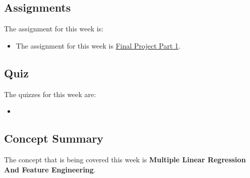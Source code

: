 \subsection{Assignments}

The assignment for this week is:

\begin{itemize}
    \item The assignment for this week is \href{https://github.com/QuantumCompiler/CU/tree/main/CSPB%203022%20-%20Introduction%20To%20Data%20Science%20With%20Probability%20And%20Statistics/CSPB%203022%20-%20Final%20Project/CSPB%203022%20-%20Final%20Project%20Part%201}{Final Project Part 1}. 
\end{itemize}

\subsection{Quiz}

The quizzes for this week are:

\begin{itemize}
    \item {} \textbullet {} 
\end{itemize}

\subsection{Concept Summary}

The concept that is being covered this week is \textbf{Multiple Linear Regression And Feature Engineering}.

